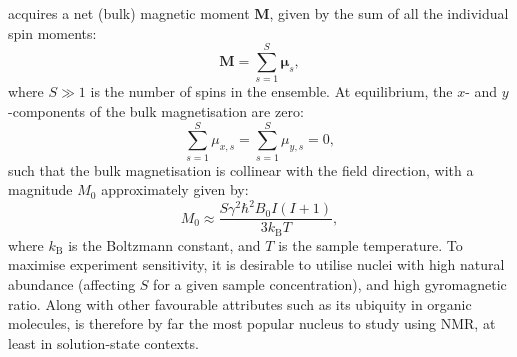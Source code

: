 acquires a net (bulk) magnetic moment $\symbf{M}$, given by the sum of all the
individual spin moments:
\begin{equation}
    \symbf{M} = \sum\limits_{s=1}^{S} \symbf{\mu}_s,
\end{equation}
where $S \gg 1$ is the number of spins in the ensemble.
At equilibrium, the $x$- and $y$-components of the bulk magnetisation are zero:
\begin{equation}
    \sum_{s=1}^{S} \mu_{x,s} = \sum_{s=1}^{S} \mu_{y,s} = 0,
\end{equation}
such that the bulk magnetisation is collinear with the field direction, with a
magnitude $M_0$ approximately given by\cite[Section 1.1]{Cavanagh2007}:
\begin{equation}
    M_0 \approx \frac{S \gamma^2 \hbar^2 B_0 I (I + 1)}{3 k_{\text{B}} T},
\end{equation}
where $k_{\text{B}}$ is the Boltzmann constant, and $T$ is the sample
temperature. To maximise experiment sensitivity, it is desirable to
utilise nuclei with high natural abundance (affecting $S$ for a given sample
concentration), and high
gyromagnetic ratio. Along with other favourable attributes such as its ubiquity
in organic molecules,  is therefore by far the most popular nucleus to
study using \ac{NMR}, at least in solution-state contexts.


